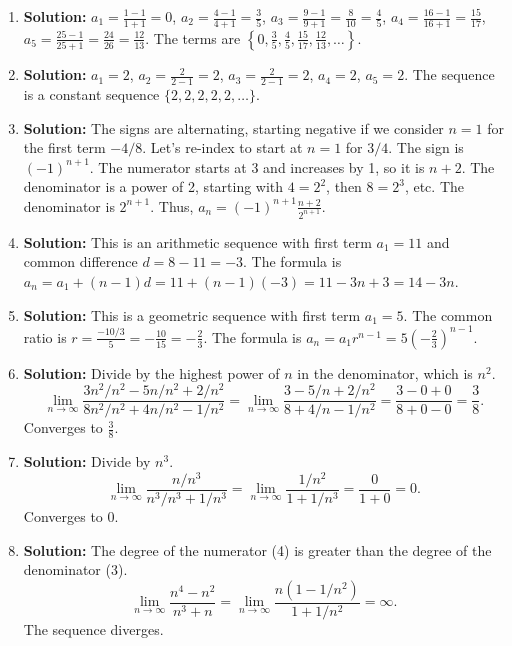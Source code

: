 \documentclass{article}
\begin{document}
\begin{enumerate}
    \item \textbf{Solution:} $a_1 = \frac{1-1}{1+1} = 0$, $a_2 = \frac{4-1}{4+1} = \frac{3}{5}$, $a_3 = \frac{9-1}{9+1} = \frac{8}{10} = \frac{4}{5}$, $a_4 = \frac{16-1}{16+1} = \frac{15}{17}$, $a_5 = \frac{25-1}{25+1} = \frac{24}{26} = \frac{12}{13}$.
    The terms are $\left\{ 0, \frac{3}{5}, \frac{4}{5}, \frac{15}{17}, \frac{12}{13}, \dots \right\}$.

    \item \textbf{Solution:} $a_1 = 2$, $a_2 = \frac{2}{2-1} = 2$, $a_3 = \frac{2}{2-1} = 2$, $a_4 = 2$, $a_5 = 2$.
    The sequence is a constant sequence $\{2, 2, 2, 2, 2, \dots\}$.

    \item \textbf{Solution:} The signs are alternating, starting negative if we consider $n=1$ for the first term $-4/8$. Let's re-index to start at $n=1$ for $3/4$. The sign is $(-1)^{n+1}$. The numerator starts at 3 and increases by 1, so it is $n+2$. The denominator is a power of 2, starting with $4 = 2^2$, then $8=2^3$, etc. The denominator is $2^{n+1}$.
    Thus, $a_n = (-1)^{n+1} \frac{n+2}{2^{n+1}}$.

    \item \textbf{Solution:} This is an arithmetic sequence with first term $a_1 = 11$ and common difference $d = 8 - 11 = -3$.
    The formula is $a_n = a_1 + (n-1)d = 11 + (n-1)(-3) = 11 - 3n + 3 = 14 - 3n$.

    \item \textbf{Solution:} This is a geometric sequence with first term $a_1 = 5$. The common ratio is $r = \frac{-10/3}{5} = -\frac{10}{15} = -\frac{2}{3}$.
    The formula is $a_n = a_1 r^{n-1} = 5 \left(-\frac{2}{3}\right)^{n-1}$.

    \item \textbf{Solution:} Divide by the highest power of $n$ in the denominator, which is $n^2$.
    \[ \lim_{n \to \infty} \frac{3n^2/n^2 - 5n/n^2 + 2/n^2}{8n^2/n^2 + 4n/n^2 - 1/n^2} = \lim_{n \to \infty} \frac{3 - 5/n + 2/n^2}{8 + 4/n - 1/n^2} = \frac{3-0+0}{8+0-0} = \frac{3}{8}. \]
    Converges to $\frac{3}{8}$.

    \item \textbf{Solution:} Divide by $n^3$.
    \[ \lim_{n \to \infty} \frac{n/n^3}{n^3/n^3 + 1/n^3} = \lim_{n \to \infty} \frac{1/n^2}{1 + 1/n^3} = \frac{0}{1+0} = 0. \]
    Converges to $0$.

    \item \textbf{Solution:} The degree of the numerator (4) is greater than the degree of the denominator (3).
    \[ \lim_{n \to \infty} \frac{n^4 - n^2}{n^3 + n} = \lim_{n \to \infty} \frac{n(1 - 1/n^2)}{1 + 1/n^2} = \infty. \]
    The sequence diverges.


\end{enumerate}
\end{document}
